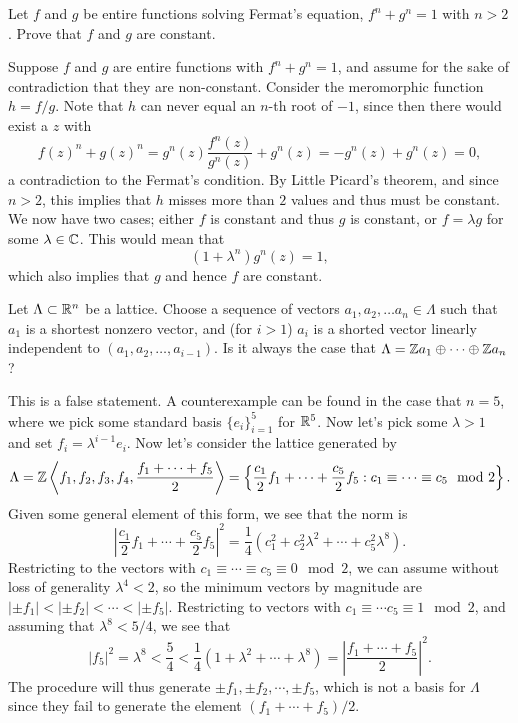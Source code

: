 \documentclass{pset}
\begin{document}
\begin{problem}{4.34}
  Let $f$ and $g$ be entire functions solving Fermat's equation, $f^n+g^n=1$ with $n>2$. Prove that $f$ and $g$ are constant. %
\end{problem}

\begin{solution}
  Suppose $f$ and $g$ are entire functions with $f^n+g^n=1$, and assume for the sake of contradiction that they are non-constant. Consider the meromorphic function $h=f/g$. Note that $h$ can never equal an $n$-th root of $-1$, since then there would exist a $z$ with
  \[
    f(z)^n+g(z)^n = g^n(z)\frac{f^n(z)}{g^n(z)}+g^n(z) = -g^n(z) + g^n(z) = 0,
  \]
  a contradiction to the Fermat's condition. By Little Picard's theorem, and since $n>2$, this implies that $h$ misses more than $2$ values and thus must be constant. We now have two cases; either $f$ is constant and thus $g$ is constant, or $f=\lambda g$ for some $\lambda\in \mathbb{C}$. This would mean that
  \[
    (1+\lambda^n)g^n(z)=1,
  \]
  which also implies that $g$ and hence $f$ are constant.
\end{solution}

\begin{problem}{5.2}
  Let $\Lambda \subset \mathbb{R}^n$ be a lattice. Choose a sequence of vectors $a_1,a_2,\ldots a_n\in \Lambda$ such that $a_1$ is a shortest nonzero vector, and (for $i>1$) $a_i$ is a shorted vector linearly independent to $(a_1,a_2,\ldots, a_{i-1})$. Is it always the case that $\Lambda = \mathbb{Z} a_1\oplus \cdots \oplus \mathbb{Z} a_n$?
\end{problem}

\begin{solution}
  This is a false statement. A counterexample can be found in the case that $n=5$, where we pick some standard basis $\{e_i\}_{i=1}^5$ for $\mathbb{R}^5$. Now let's pick some $\lambda>1$ and set $f_i=\lambda^{i-1} e_i$. Now let's consider the lattice generated by
  \[
    \Lambda = \mathbb{Z}\left\langle f_1, f_2, f_3, f_4, \frac{f_1+\cdots+f_5}{2}\right\rangle =\left\{ \frac{c_1}{2}f_1+\cdots+\frac{c_5}{2}f_5 : c_1\equiv \cdots\equiv c_5\mod 2\right\}.
  \]
  Given some general element of this form, we see that the norm is
  \[
    \left|\frac{c_1}{2}f_1+\cdots+\frac{c_5}{2}f_5\right|^2 = \frac{1}{4}\left(c_1^2 + c_2^2\lambda^2 + \cdots+c_5^2\lambda^8\right).
  \]
  Restricting to the vectors with $c_1\equiv \cdots\equiv c_5\equiv 0\mod 2$, we can assume without loss of generality $\lambda^4 < 2$, so the minimum vectors by magnitude are $|\pm f_1|<|\pm f_2|<\cdots<|\pm f_5|$. Restricting to vectors with $c_1\equiv \cdots c_5\equiv 1\mod 2$, and assuming that $\lambda^8 < 5/4$, we see that 
  \[
    |f_5|^2 = \lambda^8 < \frac{5}{4} < \frac{1}{4}(1+\lambda^2+\cdots+\lambda^8) = \left|\frac{f_1+\cdots+f_5}{2}\right|^2.
  \]
  The procedure will thus generate $\pm f_1, \pm f_2,\cdots,\pm f_5$, which is not a basis for $\Lambda$ since they fail to generate the element $(f_1+\cdots+f_5)/2$.
\end{solution}
\end{document}
